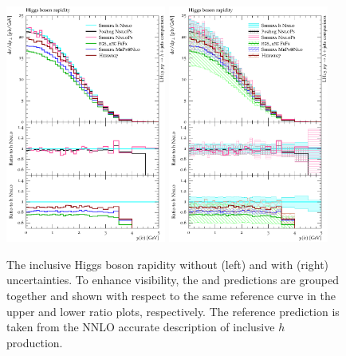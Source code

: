 \begin{figure}[t!]
  \centering
  \includegraphics[width=0.47\textwidth]{figures/hjetscomp_u_H_y.pdf}
  \hfill
  \includegraphics[width=0.47\textwidth]{figures/hjetscomp_H_y.pdf}
  \caption{\label{fig:higgscomp:results:inclobs:hy}%
    The inclusive Higgs boson rapidity without (left) and with (right)
    uncertainties. To enhance visibility, the \NNLOPS and \MEPSatNLO
    predictions are grouped together and shown with respect to the same reference
    curve in the upper and lower ratio plots, respectively. The
    reference prediction is taken from the NNLO accurate description
    of inclusive $h$ production.}
\end{figure}

